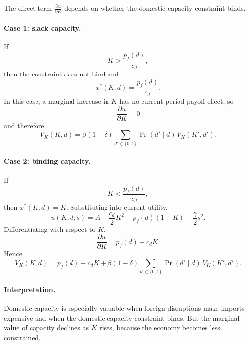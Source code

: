 \documentclass[11pt]{article}
\begin{document}
The direct term $\frac{\partial u}{\partial K}$ depends on whether the domestic capacity constraint binds.

\paragraph{Case 1: slack capacity.}
If
\begin{equation}
K > \frac{p_f(d)}{c_d},
\end{equation}
then the constraint does not bind and
\begin{equation}
x^*(K,d)=\frac{p_f(d)}{c_d}.
\end{equation}
In this case, a marginal increase in $K$ has no current-period payoff effect, so
\begin{equation}
\frac{\partial u}{\partial K}=0
\end{equation}
and therefore
\begin{equation}
V_K(K,d)
=
\beta(1-\delta)
\sum_{d'\in\{0,1\}}
\Pr(d'\mid d)\,
V_K(K',d').
\end{equation}

\paragraph{Case 2: binding capacity.}
If
\begin{equation}
K < \frac{p_f(d)}{c_d},
\end{equation}
then $x^*(K,d)=K$. Substituting into current utility,
\begin{equation}
u(K,d;s)
=
A-\frac{c_d}{2}K^2-p_f(d)(1-K)-\frac{\gamma}{2}s^2.
\end{equation}
Differentiating with respect to $K$,
\begin{equation}
\frac{\partial u}{\partial K}=p_f(d)-c_dK.
\end{equation}
Hence
\begin{equation}
V_K(K,d)
=
p_f(d)-c_dK
+
\beta(1-\delta)
\sum_{d'\in\{0,1\}}
\Pr(d'\mid d)\,
V_K(K',d').
\end{equation}

\paragraph{Interpretation.}
Domestic capacity is especially valuable when foreign disruptions make imports expensive and when the domestic capacity constraint binds. But the marginal value of capacity declines as $K$ rises, because the economy becomes less constrained.
\end{document}
